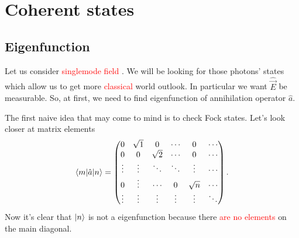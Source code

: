 \section{Coherent states}

\subsection{Eigenfunction}

Let us consider {\textcolor{red}{ singlemode field }}.
 We will be looking for those photons' states which allow us to get more {\textcolor{red} {classical}} world outlook. In particular we want $\hat{\vec{E}}$ be measurable. So, at first, we need to find eigenfunction of annihilation operator $\hat{a}$.

The first naive idea that may come to mind is to check Fock states. Let's look closer at matrix elements
\begin{equation}
	\langle m\rvert \hat{a} \lvert n\rangle =
	\begin{pmatrix}
		0 & \sqrt{1} & 0 &  \cdots  & 0 & \cdots \\
		0 & 0 & \sqrt{2} &  \cdots & 0 & \cdots \\
		\vdots & \vdots & \ddots & \ddots & \vdots  & \cdots \\
		0 & \vdots & \cdots & 0 & \sqrt{n} & \cdots \\
		\vdots & \vdots & \vdots & \vdots & \vdots & \ddots\\
	\end{pmatrix}.
\end{equation}
Now it's clear that {\textcolor{red}{ $\lvert n\rangle$ }}is not a eigenfunction because there {\textcolor{red} {are no elements }}on the main diagonal.

